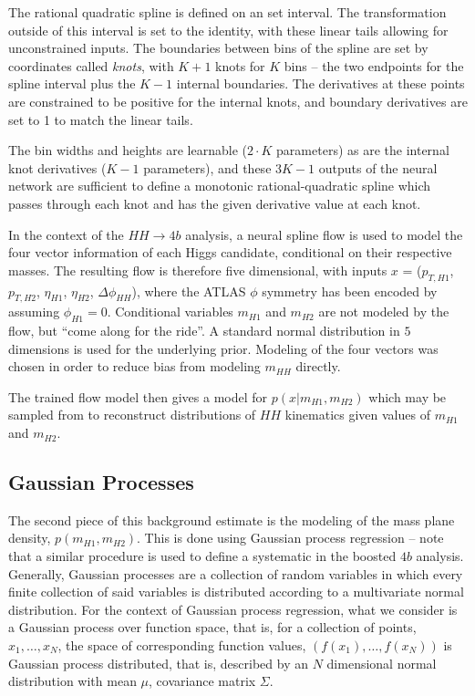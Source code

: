 The rational quadratic spline is defined on an set interval. The transformation outside of this interval 
is set to the identity, with these linear tails allowing for unconstrained inputs. The boundaries between 
bins of the spline are set by coordinates called \emph{knots}, with $K+1$ knots for $K$ bins -- the two 
endpoints for the spline interval plus the $K-1$ internal boundaries. The derivatives 
at these points are constrained to be positive for the internal knots, and boundary 
derivatives are set to 1 to match the linear tails. 

The bin widths and heights are learnable ($2\cdot K$ parameters) as are the internal knot derivatives
($K-1$ parameters), and these $3K-1$ outputs of the neural network are sufficient to define a monotonic 
rational-quadratic spline which passes through each knot and has the given derivative value at each knot.

In the context of the $HH\rightarrow 4b$ analysis, a neural spline flow is used to model the four vector 
information of each Higgs candidate, conditional on their respective masses. The resulting flow is 
therefore five dimensional, with inputs $x$ = ($p_{T, H1}$, $p_{T, H2}$, $\eta_{H1}$, $\eta_{H2}$, 
$\Delta\phi_{HH}$), where the ATLAS $\phi$ symmetry has been encoded by assuming $\phi_{H1} = 0$. 
Conditional variables $m_{H1}$ and $m_{H2}$ are not modeled by the flow, but ``come along for the ride''. 
A standard normal distribution in $5$ dimensions is used for the underlying prior. Modeling of the four 
vectors was chosen in order to reduce bias from modeling $m_{HH}$ directly.

The trained flow model then gives a model for $p(x|m_{H1}, m_{H2})$ which may be sampled from to reconstruct 
distributions of $HH$ kinematics given values of $m_{H1}$ and $m_{H2}$.

\subsection{Gaussian Processes}
The second piece of this background estimate is the modeling of the mass plane density, $p(m_{H1}, m_{H2})$. 
This is done using Gaussian process regression -- note that a similar procedure is used to define a systematic 
in the boosted $4b$ analysis. Generally, Gaussian processes are a collection of random variables in which every 
finite collection of said variables is distributed according to a multivariate normal distribution. For the 
context of Gaussian process regression, what we consider is a Gaussian process over function space, that is, 
for a collection of points, $x_{1}, \ldots, x_{N}$, the space of corresponding function 
values, $(f(x_{1}), \ldots, f(x_{N}))$ is Gaussian process distributed, that is, described by an $N$ dimensional 
normal distribution with mean $\mu$, covariance matrix $\Sigma$.

